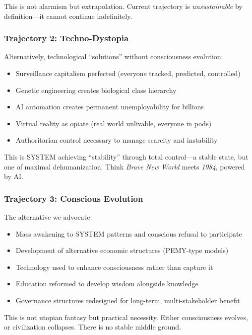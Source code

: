 \documentclass[11pt,a4paper]{article}
\theoremstyle{definition}
\theoremstyle{remark}
\begin{document}
This is not alarmism but extrapolation. Current trajectory is \textit{unsustainable} by definition---it cannot continue indefinitely.

\subsubsection{Trajectory 2: Techno-Dystopia}

Alternatively, technological ``solutions'' without consciousness evolution:
\begin{itemize}
    \item Surveillance capitalism perfected (everyone tracked, predicted, controlled)
    \item Genetic engineering creates biological class hierarchy
    \item AI automation creates permanent unemployability for billions
    \item Virtual reality as opiate (real world unlivable, everyone in pods)
    \item Authoritarian control necessary to manage scarcity and instability
\end{itemize}

This is SYSTEM achieving ``stability'' through total control---a stable state, but one of maximal dehumanization. Think \textit{Brave New World} meets \textit{1984}, powered by AI.

\subsubsection{Trajectory 3: Conscious Evolution}

The alternative we advocate:
\begin{itemize}
    \item Mass awakening to SYSTEM patterns and conscious refusal to participate
    \item Development of alternative economic structures (PEMY-type models)
    \item Technology used to enhance consciousness rather than capture it
    \item Education reformed to develop wisdom alongside knowledge
    \item Governance structures redesigned for long-term, multi-stakeholder benefit
\end{itemize}

This is not utopian fantasy but practical necessity. Either consciousness evolves, or civilization collapses. There is no stable middle ground.
\end{document}
